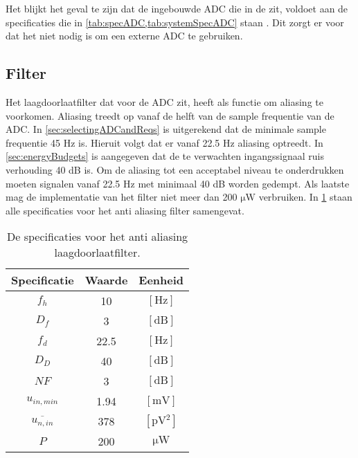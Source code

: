 Het blijkt het geval te zijn dat de ingebouwde ADC die in de \mcu  zit, voldoet aan de specificaties die in \cref{tab:specADC,tab:systemSpecADC} staan \cite{nrf52810}. Dit zorgt er voor dat het niet nodig is om een externe ADC te gebruiken.

\subsection{Filter}
Het laagdoorlaatfilter dat voor de ADC zit, heeft als functie om aliasing te voorkomen. Aliasing treedt op vanaf de helft van de sample frequentie van de ADC. In \cref{sec:selectingADCandReqs} is uitgerekend dat de minimale sample frequentie 45 Hz is. Hieruit volgt dat er vanaf 22.5 Hz aliasing optreedt. In \cref{sec:energyBudgets} is aangegeven dat de te verwachten ingangssignaal ruis verhouding 40 dB is. Om de aliasing tot een acceptabel niveau te onderdrukken moeten signalen vanaf 22.5 Hz met minimaal 40 dB worden gedempt. Als laatste mag de implementatie van het filter niet meer dan 200 $\si{\micro\watt}$ verbruiken. In \cref{tab:specsAAfilter} staan alle specificaties voor het anti aliasing filter samengevat.
\begin{table}[ht]
    \centering
    \begin{tabular}{c|c|c}
        Specificatie & Waarde & Eenheid \\\hline
        $f_h$       & 10   & $[\si{\hertz}]$ \\
        $D_f$       & 3    & $[\mathrm{dB}]$ \\
        $f_d$       & 22.5 & $[\si{\hertz}]$ \\
        $D_D$       & 40   & $[\mathrm{dB}]$ \\
        $NF$        & 3    & $[\mathrm{dB}]$ \\
        $u_{in,min}$& 1.94 & $[\si{\milli\volt}]$  \\
        $\overline{u_{n,in}}$ & 378 & $[\si{\pico\volt^2}]$\\
        $P$         & 200  & $\si{\micro\watt}$ \\
    \end{tabular}
    \caption{De specificaties voor het anti aliasing laagdoorlaatfilter.}
    \label{tab:specsAAfilter}
\end{table}

